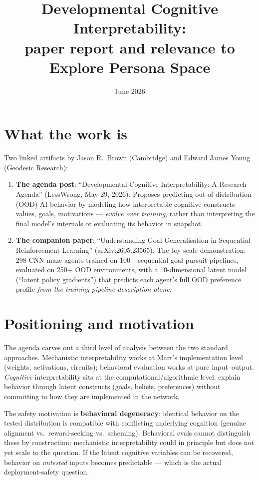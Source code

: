 \documentclass[11pt]{article}
\title{Developmental Cognitive Interpretability:\\ paper report and relevance to Explore Persona Space}
\author{}
\date{June 2026}
\begin{document}
\maketitle
\vspace{-3em}

\section{What the work is}
\label{sec:overview}

Two linked artifacts by Jason R.\ Brown (Cambridge) and Edward James Young (Geodesic Research):

\begin{enumerate}
\item \textbf{The agenda post}: ``Developmental Cognitive Interpretability: A Research Agenda'' (LessWrong, May 29, 2026). Proposes predicting out-of-distribution (OOD) AI behavior by modeling how interpretable cognitive constructs --- values, goals, motivations --- \emph{evolve over training}, rather than interpreting the final model's internals or evaluating its behavior in snapshot.
\item \textbf{The companion paper}: ``Understanding Goal Generalisation in Sequential Reinforcement Learning'' (arXiv:2605.23565). The toy-scale demonstration: 298 CNN maze agents trained on 100+ sequential goal-pursuit pipelines, evaluated on 250+ OOD environments, with a 10-dimensional latent model (``latent policy gradients'') that predicts each agent's full OOD preference profile \emph{from the training pipeline description alone}.
\end{enumerate}

\section{Positioning and motivation}
\label{sec:positioning}

The agenda carves out a third level of analysis between the two standard approaches. Mechanistic interpretability works at Marr's implementation level (weights, activations, circuits); behavioral evaluation works at pure input--output. \emph{Cognitive} interpretability sits at the computational/algorithmic level: explain behavior through latent constructs (goals, beliefs, preferences) without committing to how they are implemented in the network.

The safety motivation is \textbf{behavioral degeneracy}: identical behavior on the tested distribution is compatible with conflicting underlying cognition (genuine alignment vs.\ reward-seeking vs.\ scheming). Behavioral evals cannot distinguish these by construction; mechanistic interpretability could in principle but does not yet scale to the question. If the latent cognitive variables can be recovered, behavior on \emph{untested} inputs becomes predictable --- which is the actual deployment-safety question.
\end{document}
